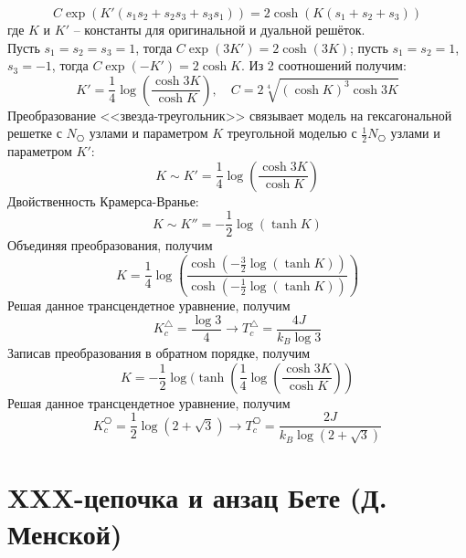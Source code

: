 \documentclass[12pt]{article}
\begin{document}
\begin{equation}
    C\exp(K'(s_1s_2+s_2s_3+s_3s_1))=2\cosh(K(s_1+s_2+s_3))
\end{equation}
где $K$ и $K'$ -- константы для оригинальной и дуальной решёток.\\
Пусть $s_1=s_2=s_3=1$, тогда $C\exp(3K')=2\cosh(3K)$; пусть $s_1=s_2=1$, $s_3=-1$, тогда $ C\exp(-K')=2\cosh K$. Из 2 соотношений получим:
\begin{equation}
    K'=\frac{1}{4}\log\left(\frac{\cosh 3K}{\cosh K}\right),\quad C=2\sqrt[4]{(\cosh K)^3\cosh 3K}
\end{equation}
Преобразование <<звезда-треугольник>> связывает модель на гексагональной решетке с $N_{\hexagon}$ узлами и параметром $K$ треугольной моделью с $\frac{1}{2}N_{\hexagon}$ узлами и параметром $K'$:
\begin{equation}
    K\sim K'=\frac{1}{4}\log\left(\frac{\cosh 3K}{\cosh K}\right)
\end{equation}
Двойственность Крамерса-Вранье:
\begin{equation}
    K\sim K''=-\frac{1}{2}\log(\tanh K)
\end{equation}
Объединяя преобразования, получим
\begin{equation}
    K=\frac{1}{4}\log\left(\frac{\cosh(-\frac{3}{2}\log(\tanh K))}{\cosh(-\frac{1}{2}\log(\tanh K))}\right)
\end{equation}
Решая данное трансцендетное уравнение, получим
\begin{equation}
    K_c^\triangle=\frac{\log 3}{4}\rightarrow \boxed{T_c^\triangle=\frac{4J}{k_B\log 3}}
\end{equation}
Записав преобразования в обратном порядке, получим
\begin{equation}
    K=-\frac{1}{2}\log(\tanh\left(\frac{1}{4}\log\left(\frac{\cosh 3K}{\cosh K}\right)\right)
\end{equation}
Решая данное трансцендетное уравнение, получим
\begin{equation}
     K_c^{\hexagon}=\frac{1}{2}\log(2+\sqrt{3})\rightarrow \boxed{T_c^{\hexagon}=\frac{2J}{k_B\log(2+\sqrt{3})}}
\end{equation}
\section{XXX-цепочка и анзац Бете (Д. Менской)}
\end{document}

